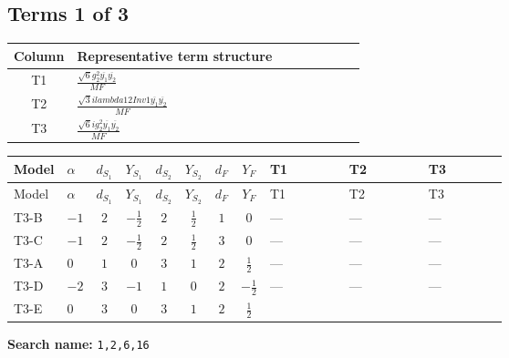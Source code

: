 \documentclass[8pt]{article}
\begin{document}
\begin{landscape}
\subsection*{Terms 1 of 3}
\begin{center}
\begin{tabular}{@{}c >{\raggedright\arraybackslash}p{0.82\linewidth}@{}}
\toprule
Column & Representative term structure \\
\midrule
T1 & \(\displaystyle \frac{\sqrt{6} g_{2}^{2} \overline{y_{1}} \overline{y_{2}}}{MF}\) \\
\midrule
T2 & \(\displaystyle \frac{\sqrt{3} i lambda12Inv1 \overline{y_{1}} \overline{y_{2}}}{MF}\) \\
\midrule
T3 & \(\displaystyle \frac{\sqrt{6} i g_{2}^{2} \overline{y_{1}} \overline{y_{2}}}{MF}\) \\
\midrule
\bottomrule
\end{tabular}
\end{center}
\smallskip
\tiny
\begin{longtable}{@{}llcccccc >{\raggedright\arraybackslash}p{0.21\linewidth} >{\raggedright\arraybackslash}p{0.21\linewidth} >{\raggedright\arraybackslash}p{0.21\linewidth}@{}}
\toprule
Model & $\alpha$ & $d_{S_1}$ & $Y_{S_1}$ & $d_{S_2}$ & $Y_{S_2}$ & $d_F$ & $Y_F$ & T1 & T2 & T3 \\
\midrule
\endfirsthead
\toprule
Model & $\alpha$ & $d_{S_1}$ & $Y_{S_1}$ & $d_{S_2}$ & $Y_{S_2}$ & $d_F$ & $Y_F$ & T1 & T2 & T3 \\
\midrule
\endhead
T3-B & $-1$ & $2$ & $-\frac{1}{2}$ & $2$ & $\frac{1}{2}$ & $1$ & $0$ & --- & --- & --- \\
\midrule
T3-C & $-1$ & $2$ & $-\frac{1}{2}$ & $2$ & $\frac{1}{2}$ & $3$ & $0$ & --- & --- & --- \\
\midrule
T3-A & $0$ & $1$ & $0$ & $3$ & $1$ & $2$ & $\frac{1}{2}$ & --- & --- & --- \\
\midrule
T3-D & $-2$ & $3$ & $-1$ & $1$ & $0$ & $2$ & $-\frac{1}{2}$ & --- & --- & --- \\
\midrule
T3-E & $0$ & $3$ & $0$ & $3$ & $1$ & $2$ & $\frac{1}{2}$ & \scriptsize\adjustbox{max width=\linewidth}{$\begin{gathered} - \frac{\sqrt{6} g_{2}^{2} \overline{y_{1}} \overline{y_{2}}}{6 MF}\end{gathered}$} & \scriptsize\adjustbox{max width=\linewidth}{$\begin{gathered} - \frac{\sqrt{3} i lambda12Inv1 \overline{y_{1}} \overline{y_{2}}}{6 MF}\end{gathered}$} & \scriptsize\adjustbox{max width=\linewidth}{$\begin{gathered} \frac{\sqrt{6} i g_{2}^{2} \overline{y_{1}} \overline{y_{2}}}{6 MF}\end{gathered}$} \\
\midrule
\bottomrule
\end{longtable}
\clearpage
\noindent\textbf{Search name: }\texttt{1,2,6,16}\par\smallskip

\end{landscape}
\end{document}
